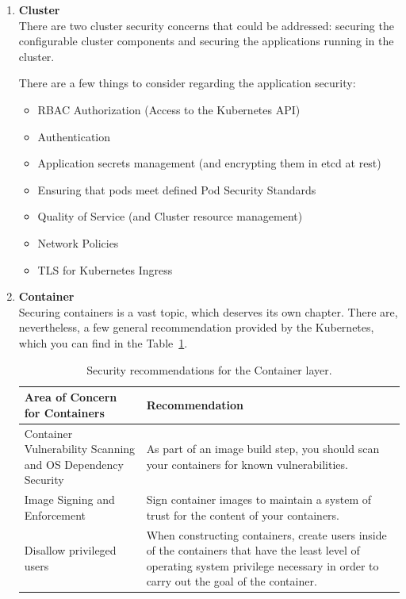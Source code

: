 \begin{enumerate}
\item \textbf{Cluster} \\
There are two cluster security concerns that could be addressed: securing the configurable cluster components and securing the applications running in the cluster.

There are a few things to consider regarding the application security:
\begin{itemize}
\item RBAC Authorization (Access to the Kubernetes API)
\item Authentication	
\item Application secrets management (and encrypting them in etcd at rest)
\item Ensuring that pods meet defined Pod Security Standards
\item Quality of Service (and Cluster resource management)
\item Network Policies
\item TLS for Kubernetes Ingress
\end{itemize}

\item \textbf{Container} \\
Securing containers is a vast topic, which deserves its own chapter. There are, nevertheless, a few general recommendation provided by the Kubernetes, which you can find in the Table~\ref{tab:container-security-recommendations}.

\begin{table}[H]
    \begin{center}
        \begin{tabular}{ | p{} | p{} | } 
        \hline
        \textbf{Area of Concern for Containers} & \textbf{Recommendation} \\ 
        \hline
        Container Vulnerability Scanning and OS Dependency Security & As part of an image build step, you should scan your containers for known vulnerabilities. \\ 
        \hline
        Image Signing and Enforcement & Sign container images to maintain a system of trust for the content of your containers. \\ 
        \hline
        Disallow privileged users & When constructing containers, create users inside of the containers that have the least level of operating system privilege necessary in order to carry out the goal of the container. \\
        \hline
        \end{tabular}
    \end{center}
    \caption{Security recommendations for the Container layer.}
    \label{tab:container-security-recommendations}
\end{table}


\end{enumerate}
